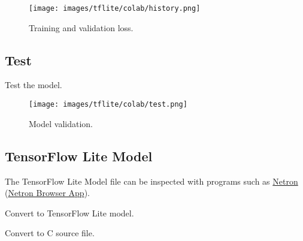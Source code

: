 \documentclass[aspectratio=169]{beamer}
\begin{document}
\begin{frame}
    \begin{figure}
        \texttt{[image: images/tflite/colab/history.png]}
        \caption{Training and validation loss.}
    \end{figure}
\end{frame}

\subsection{Test}

\begin{frame}
    \begin{listing}[H]
        \caption{Test the model.}
        \label{lst:tflite:sinewave:test}
    \end{listing}
\end{frame}

\begin{frame}
    \begin{figure}
        \texttt{[image: images/tflite/colab/test.png]}
        \caption{Model validation.}
    \end{figure}
\end{frame}

\subsection{TensorFlow Lite Model}

\begin{frame}
    \par The TensorFlow Lite Model file can be inspected with programs such as \href{https://github.com/lutzroeder/netron}{Netron} (\href{https://netron.app/}{Netron Browser App}).
    \begin{listing}[H]
        \caption{Convert to TensorFlow Lite model.}
        \label{lst:tflite:sinewave:tflite_model}
    \end{listing}
    \begin{listing}[H]
        \caption{Convert to C source file.}
        \label{lst:tflite:sinewave:tflite_model:c}
    \end{listing}
\end{frame}
\end{document}
